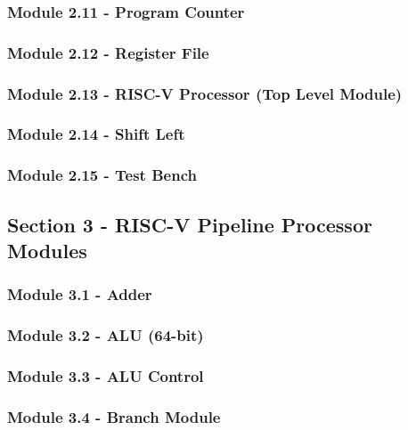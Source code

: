\documentclass[12pt]{article}
\begin{document}
\subsubsection*{\large Module 2.11 - Program Counter}

\subsubsection*{\large Module 2.12 - Register File}

\subsubsection*{\large Module 2.13 - RISC-V Processor (Top Level Module)}

\subsubsection*{\large Module 2.14 - Shift Left}

\subsubsection*{\large Module 2.15 - Test Bench}

\subsection*{\Large Section 3 - RISC-V Pipeline Processor Modules}
\subsubsection*{\large Module 3.1 - Adder}

\subsubsection*{\large Module 3.2 - ALU (64-bit)}

\subsubsection*{\large Module 3.3 - ALU Control}

\subsubsection*{\large Module 3.4 - Branch Module}

\end{document}
